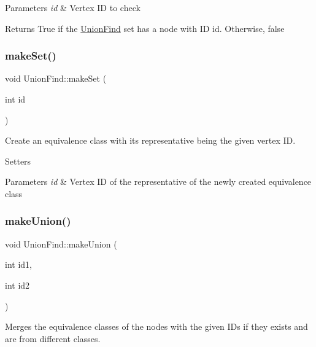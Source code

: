 \begin{DoxyParams}{Parameters}
{\em id} & Vertex ID to check \\
\hline
\end{DoxyParams}
\begin{DoxyReturn}{Returns}
True if the \hyperlink{classUnionFind}{Union\+Find} set has a node with ID \textquotesingle{}id\textquotesingle{}. Otherwise, false 
\end{DoxyReturn}
\mbox{\label{classUnionFind_ac1bd057d6b8d5a834650c29677d99c98}} 
\subsubsection{\texorpdfstring{make\+Set()}{makeSet()}}
{\footnotesize\ttfamily void Union\+Find\+::make\+Set (\begin{DoxyParamCaption}\item[{int}]{id }\end{DoxyParamCaption})}



Create an equivalence class with its representative being the given vertex ID. 

Setters 
\begin{DoxyParams}{Parameters}
{\em id} & Vertex ID of the representative of the newly created equivalence class \\
\hline
\end{DoxyParams}
\mbox{\label{classUnionFind_a4ebd8dadae9c2be54bc474af93ce3b80}} 
\subsubsection{\texorpdfstring{make\+Union()}{makeUnion()}}
{\footnotesize\ttfamily void Union\+Find\+::make\+Union (\begin{DoxyParamCaption}\item[{int}]{id1,  }\item[{int}]{id2 }\end{DoxyParamCaption})}



Merges the equivalence classes of the nodes with the given I\+Ds if they exists and are from different classes. 



